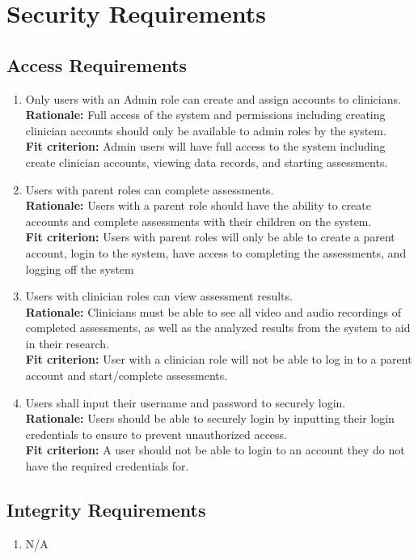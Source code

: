 \documentclass[12pt]{article}
\begin{document}
\section{Security Requirements}
\subsection{Access Requirements}
\begin{enumerate}[{SR-AC}1. ]
  \item Only users with an Admin role can create and assign accounts to clinicians.\\
  \textbf{Rationale: }Full access of the system and permissions including creating clinician accounts should only be available to admin roles by the system. \\
  \textbf{Fit criterion: }Admin users will have full access to the system including create clinician accounts, viewing data records, and starting assessments. 
  \item Users with parent roles can complete assessments.\\
  \textbf{Rationale: }Users with a parent role should have the ability to create accounts and complete assessments with their children on the system.\\
  \textbf{Fit criterion: }Users with parent roles will only be able to create a parent account, login to the system, have access to completing the assessments, and logging off the system 
  \item Users with clinician roles can view assessment results.\\
  \textbf{Rationale: }Clinicians must be able to see all video and audio recordings of completed assessments, as well as the analyzed results from the system to aid in their research. \\
  \textbf{Fit criterion: }User with a clinician role will not be able to log in to a parent account and start/complete assessments. 
  \item Users shall input their username and password to securely login.\\
  \textbf{Rationale: }Users should be able to securely login by inputting their login credentials to ensure to prevent unauthorized access. \\
  \textbf{Fit criterion: }A user should not be able to login to an account they do not have the required credentials for.
\end{enumerate}
\subsection{Integrity Requirements}
\begin{enumerate}[{SR-INT}1. ]
  \item N/A
\end{enumerate}
\end{document}
